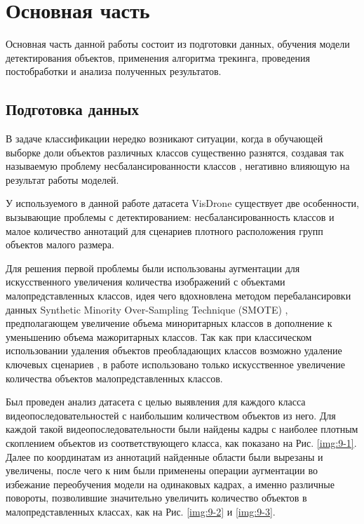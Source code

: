\section{Основная часть}

Основная часть данной работы состоит из подготовки данных, обучения модели детектирования объектов, применения алгоритма трекинга, проведения постобработки и анализа полученных результатов.

\subsection{Подготовка данных}

В задаче классификации нередко возникают ситуации, когда в обучающей выборке доли объектов различных классов существенно разнятся, создавая так называемую проблему несбалансированности классов \cite{9-1}, негативно влияющую на результат работы моделей.

У используемого в данной работе датасета VisDrone существует две особенности, вызывающие проблемы с детектированием: несбалансированность классов и малое количество аннотаций для сценариев плотного расположения групп объектов малого размера.

Для решения первой проблемы были использованы аугментации для искусственного увеличения количества изображений с объектами малопредставленных классов, идея чего вдохновлена методом перебалансировки данных Synthetic Minority Over-Sampling Technique (SMOTE) \cite{9-2}, предполагающем увеличение объема миноритарных классов в дополнение к уменьшению объема мажоритарных классов. Так как при классическом использовании удаления объектов преобладающих классов возможно удаление ключевых сценариев \cite{9-3}, в работе использовано только искусственное увеличение количества объектов малопредставленных классов.

Был проведен анализ датасета с целью выявления для каждого класса видеопоследовательностей с наибольшим количеством объектов из него. Для каждой такой видеопоследовательности были найдены кадры с наиболее плотным скоплением объектов из соответствующего класса, как показано на Рис. \ref{img:9-1}. Далее по координатам из аннотаций найденные области были вырезаны и увеличены, после чего к ним были применены операции аугментации во избежание переобучения модели на одинаковых кадрах, а именно различные повороты, позволившие значительно увеличить количество объектов в малопредставленных классах, как на Рис. \ref{img:9-2} и \ref{img:9-3}.

\vspace{0.5cm}

